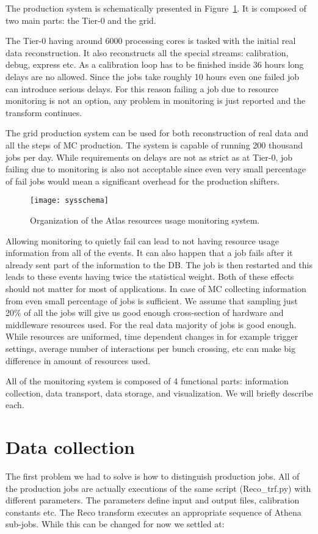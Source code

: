 \documentclass{atlasnote}
\begin{document}
The production system is schematically presented in Figure~\ref{fig:sysschema}. It is composed of two main parts: the Tier-0 and the grid.

The Tier-0 having around 6000 processing cores is tasked with the initial real data reconstruction. It also reconstructs all the special streams: calibration, debug, express etc. As a calibration loop has to be finished inside 36 hours long delays are no allowed. Since the jobs take roughly 10 hours even one failed job can introduce serious delays. For this reason failing a job due to resource monitoring is not an option, any problem in monitoring is just reported and the transform continues.

The grid production system can be used for both reconstruction of real data and all the steps of MC production. The system is capable of running 200 thousand jobs per day. While requirements on delays are not as strict as at Tier-0, job failing due to monitoring is also not acceptable since even very small percentage of fail jobs would mean a significant overhead for the production shifters.  

\begin{figure}
  \centering
  \texttt{[image: sysschema]}
  \caption{Organization of the Atlas resources usage monitoring system.}
  \label{fig:sysschema}
\end{figure}

Allowing monitoring to quietly fail can lead to not having resource usage information from all of the events. It can also happen that a job fails after it already sent part of the information to the DB. The job is then restarted and this leads to these events having twice the statistical weight. Both of these effects should not matter for most of applications. In case of MC collecting information from even small percentage of jobs is sufficient. We assume that sampling just 20\% of all the jobs will give us good enough cross-section of hardware and middleware resources used.  For the real data majority of jobs is good enough. While resources are uniformed, time dependent changes in for example trigger settings, average number of interactions per bunch crossing, etc can make big difference in amount of resources used.
    
All of the monitoring system is composed of 4 functional parts: information collection, data transport, data storage, and visualization. We will briefly describe each.

\section{Data collection}
The first problem we had to solve is how to distinguish production jobs. 
All of the production jobs are actually executions of the same script (Reco_trf.py) with different parameters. The parameters define input and output files, calibration constants etc. The Reco transform executes an appropriate sequence of Athena sub-jobs.  
While this can be changed for now we settled at:
\end{document}
